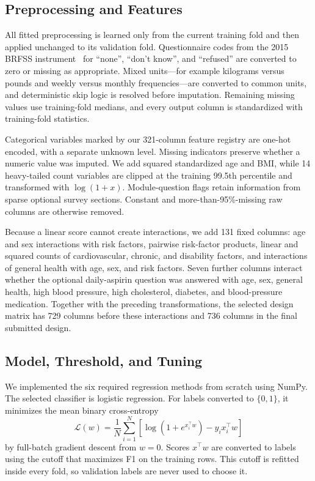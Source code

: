 \documentclass[10pt,conference,compsocconf]{IEEEtran}
\begin{document}
\subsection{Preprocessing and Features}

All fitted preprocessing is learned only from the current training fold and
then applied unchanged to its validation fold.  Questionnaire codes from the
2015 BRFSS instrument~\cite{cdc2015questionnaire} for
``none'', ``don't know'', and ``refused'' are converted to zero or missing as
appropriate.  Mixed units---for example kilograms versus pounds and weekly
versus monthly frequencies---are converted to common units, and deterministic
skip logic is resolved before imputation.  Remaining missing values use
training-fold medians, and every output column is standardized with
training-fold statistics.

Categorical variables marked by our 321-column feature registry are one-hot
encoded, with a separate unknown level.  Missing indicators preserve whether
a numeric value was imputed.  We add squared standardized age and BMI, while
14 heavy-tailed count variables are clipped at the training 99.5th percentile
and transformed with $\log(1+x)$.  Module-question flags retain information
from sparse optional survey sections.  Constant and more-than-95\%-missing raw
columns are otherwise removed.

Because a linear score cannot create interactions, we add 131 fixed columns:
age and sex interactions with risk factors, pairwise risk-factor products,
linear and squared counts of cardiovascular, chronic, and disability factors,
and interactions of general health with age, sex, and risk factors.  Seven
further columns interact whether the optional daily-aspirin question was
answered with age, sex, general health, high blood pressure, high cholesterol,
diabetes, and blood-pressure medication.  Together with the preceding
transformations, the selected design matrix has 729 columns before these
interactions and 736 columns in the final submitted design.

\subsection{Model, Threshold, and Tuning}

We implemented the six required regression methods from scratch using NumPy.
The selected classifier is logistic regression.  For labels converted to
$\{0,1\}$, it minimizes the mean binary cross-entropy
\begin{equation}
  \mathcal{L}(w)=\frac{1}{N}\sum_{i=1}^{N}
  \left[\log(1+e^{x_i^\top w})-y_i x_i^\top w\right]
\end{equation}
by full-batch gradient descent from $w=0$.  Scores $x^\top w$ are converted to
labels using the cutoff that maximizes F1 on the training rows.  This cutoff is
refitted inside every fold, so validation labels are never used to choose it.
\end{document}
